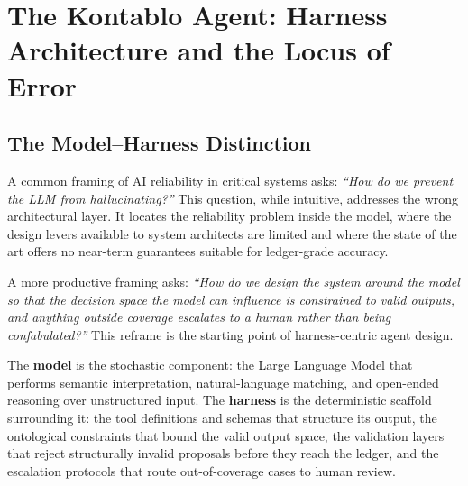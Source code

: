 
\section{The Kontablo Agent: Harness Architecture and the Locus of Error}
\label{sec:harness}

\subsection{The Model--Harness Distinction}
\label{subsec:model_harness}

A common framing of AI reliability in critical systems asks:
\emph{``How do we prevent the LLM from hallucinating?''}
This question, while intuitive, addresses the wrong architectural layer.
It locates the reliability problem inside the model, where the design levers
available to system architects are limited and where the state of the art
offers no near-term guarantees suitable for ledger-grade accuracy.

A more productive framing asks:
\emph{``How do we design the system around the model so that the
decision space the model can influence is constrained to valid outputs,
and anything outside coverage escalates to a human rather than being
confabulated?''} This reframe is the starting point of harness-centric
agent design.

The \textbf{model} is the stochastic component: the Large Language Model that
performs semantic interpretation, natural-language matching, and
open-ended reasoning over unstructured input. The \textbf{harness} is the
deterministic scaffold surrounding it: the tool definitions and schemas
that structure its output, the ontological constraints that bound the valid
output space, the validation layers that reject structurally invalid proposals
before they reach the ledger, and the escalation protocols that route
out-of-coverage cases to human review.

